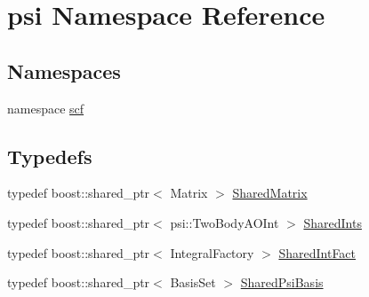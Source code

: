 \hypertarget{namespacepsi}{
\section{psi Namespace Reference}
\label{namespacepsi}
}
\subsection*{Namespaces}
\begin{DoxyCompactItemize}
\item 
namespace \hyperlink{namespacepsi_1_1scf}{scf}
\end{DoxyCompactItemize}
\subsection*{Typedefs}
\begin{DoxyCompactItemize}
\item 
typedef boost::shared\_\-ptr$<$ Matrix $>$ \hyperlink{namespacepsi_a672173d36fd5e5d06c17ff19c3bacb9d}{SharedMatrix}
\item 
typedef boost::shared\_\-ptr$<$ psi::TwoBodyAOInt $>$ \hyperlink{namespacepsi_a7b2115040860b8011075023be6fbeb9a}{SharedInts}
\item 
typedef boost::shared\_\-ptr$<$ IntegralFactory $>$ \hyperlink{namespacepsi_a3b03bcb6d101bc7caa7ea1a26b9e1f50}{SharedIntFact}
\item 
typedef boost::shared\_\-ptr$<$ BasisSet $>$ \hyperlink{namespacepsi_a00b3104f9d454b5adfe2d16e5f8d1e14}{SharedPsiBasis}
\end{DoxyCompactItemize}


